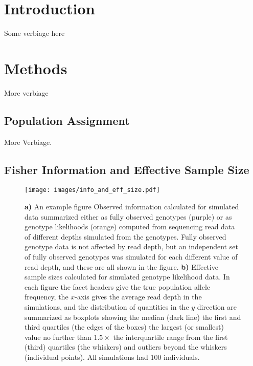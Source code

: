 
\section*{Introduction}

Some verbiage here

\section*{Methods}

More verbiage

\subsection*{Population Assignment}

More Verbiage.


\subsection*{Fisher Information and Effective Sample Size}

\begin{figure*}
\newcommand{\esssimscap}{\footnotesize {\bf a)} An example figure Observed information calculated for simulated data summarized either as fully observed genotypes (purple)
or as genotype likelihoods (orange) computed from sequencing read data of different depths simulated from the genotypes. Fully observed genotype data is not affected by read depth, but an independent set of fully observed genotypes was simulated for each different value of read depth, and these are all shown in the figure.  {\bf b)} Effective sample sizes calculated for simulated genotype likelihood data.
In each figure the facet headers give the true population allele frequency, the $x$-axis gives the
average read depth in the simulations, and the distribution of quantities in the $y$ direction are summarized
as boxplots showing the median (dark line) the first and third quartiles (the edges of the boxes)  the largest (or smallest) value no further than $1.5 \times\mbox{}$ the interquartile range from the first (third) quartiles (the
whiskers) and outliers beyond the whiskers (individual points). All simulations had 100 individuals.}
\begin{center}
\texttt{[image: images/info\_and\_eff\_size.pdf]}
\end{center}
\caption[\esssimscap]{\esssimscap}
\label{fig:ess_sims}
\end{figure*}
